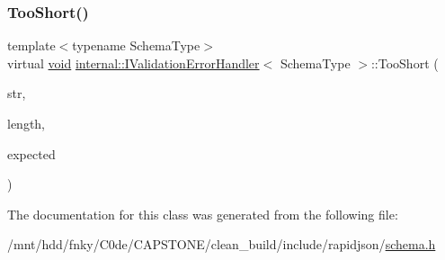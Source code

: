 \subsubsection{\texorpdfstring{Too\+Short()}{TooShort()}}
{\footnotesize\ttfamily template$<$typename Schema\+Type$>$ \\
virtual \hyperlink{imgui__impl__opengl3__loader_8h_ac668e7cffd9e2e9cfee428b9b2f34fa7}{void} \hyperlink{classinternal_1_1IValidationErrorHandler}{internal\+::\+I\+Validation\+Error\+Handler}$<$ Schema\+Type $>$\+::Too\+Short (\begin{DoxyParamCaption}\item[{const \hyperlink{classinternal_1_1IValidationErrorHandler_a22e6a5f35edb9b614156ad606dcc79d7}{Ch} $\ast$}]{str,  }\item[{\hyperlink{rapidjson_8h_a5ed6e6e67250fadbd041127e6386dcb5}{Size\+Type}}]{length,  }\item[{\hyperlink{rapidjson_8h_a5ed6e6e67250fadbd041127e6386dcb5}{Size\+Type}}]{expected }\end{DoxyParamCaption})\hspace{0.3cm}{\ttfamily [pure virtual]}}



The documentation for this class was generated from the following file\+:\begin{DoxyCompactItemize}
\item 
/mnt/hdd/fnky/\+C0de/\+C\+A\+P\+S\+T\+O\+N\+E/clean\+\_\+build/include/rapidjson/\hyperlink{schema_8h}{schema.\+h}\end{DoxyCompactItemize}
